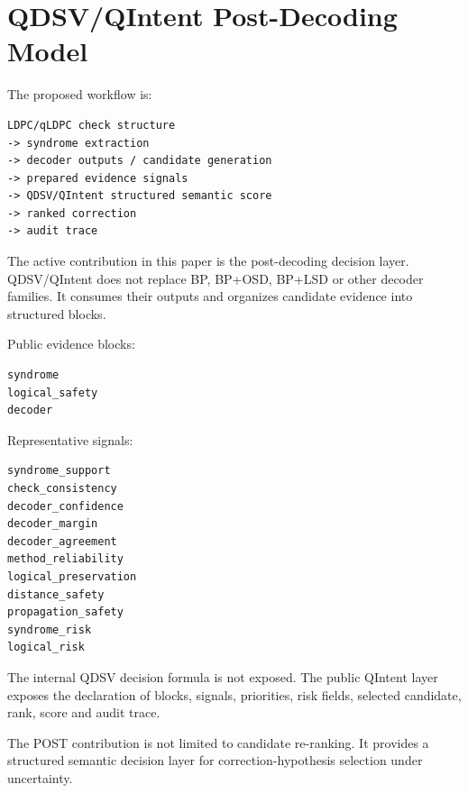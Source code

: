 \documentclass[11pt]{article}
\begin{document}
\section{QDSV/QIntent Post-Decoding Model}

The proposed workflow is:


\begin{lstlisting}
LDPC/qLDPC check structure
-> syndrome extraction
-> decoder outputs / candidate generation
-> prepared evidence signals
-> QDSV/QIntent structured semantic score
-> ranked correction
-> audit trace
\end{lstlisting}

The active contribution in this paper is the post-decoding decision layer. QDSV/QIntent does not replace BP, BP+OSD, BP+LSD or other decoder families. It consumes their outputs and organizes candidate evidence into structured blocks.


Public evidence blocks:


\begin{lstlisting}
syndrome
logical_safety
decoder
\end{lstlisting}

Representative signals:


\begin{lstlisting}
syndrome_support
check_consistency
decoder_confidence
decoder_margin
decoder_agreement
method_reliability
logical_preservation
distance_safety
propagation_safety
syndrome_risk
logical_risk
\end{lstlisting}

The internal QDSV decision formula is not exposed. The public QIntent layer exposes the declaration of blocks, signals, priorities, risk fields, selected candidate, rank, score and audit trace.


The POST contribution is not limited to candidate re-ranking. It provides a structured semantic decision layer for correction-hypothesis selection under uncertainty.
\end{document}
